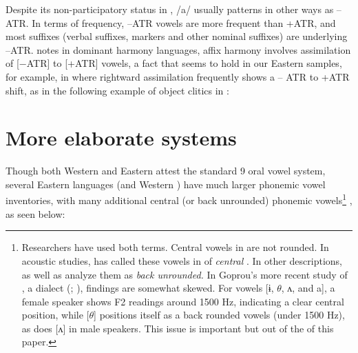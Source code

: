 \documentclass[output=paper
,newtxmath
,modfonts
,nonflat]{langsci/langscibook}
\begin{document}
Despite its non-participatory status in , /a/ usually patterns in other ways as –ATR. In terms of frequency, –ATR vowels are more frequent than +ATR, and most suffixes (verbal suffixes,  markers and other nominal suffixes) are underlying –ATR. \citet{Casali2008} notes in dominant harmony languages, affix harmony involves assimilation of [$-$ATR] to [+ATR] vowels, a fact that seems to hold in our Eastern  samples, for example, in  where rightward assimilation frequently shows a – ATR to +ATR shift, as in the following example of object clitics in :


\ea%
    \label{ex:zogbo:3}
		 \citep{Marchese1975}
    \z







\section{More elaborate systems}\label{sec:zogbo:2} 

Though both Western and Eastern  attest the standard 9 oral vowel system, several Eastern  languages (and Western ) have much larger phonemic vowel inventories, with many additional central (or back unrounded) phonemic vowels\footnote{Researchers have used both terms.  Central vowels in  are not rounded. In acoustic studies, \citet{grégoire1972} has called these vowels in  of  \textit{central} \citep[see also][15]{Zogbo1981}. In other descriptions, \citet[61]{Werle1976} as well as \citet[7]{kipre2005} analyze them as \textit{back unrounded.} In Goprou’s more recent study of , a  dialect (\citeyear{Goprou2010}; \citeyear[177]{Goprou2014}), findings are somewhat skewed. For vowels [ɨ, $\theta $, ʌ, and a], a female speaker shows F2 readings around 1500 Hz, indicating a clear central position, while [$\theta $] positions itself as a back rounded vowels (under 1500 Hz), as does [ʌ] in male speakers. This issue is important but out of the  of this paper.} , as seen below:
\end{document}
